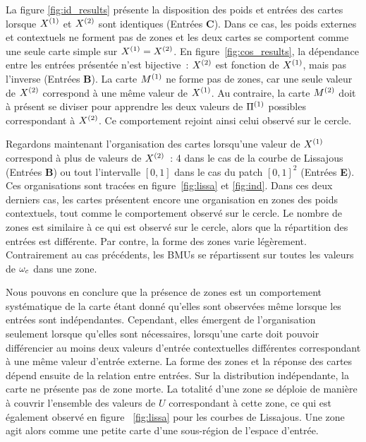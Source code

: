 \documentclass[../main]{subfiles}
\begin{document}
La figure \ref{fig:id_results} présente la disposition des poids et entrées des cartes lorsque $X^{({1})}$ et $X^{({2})}$ sont identiques (Entrées \textbf{C}).
Dans ce cas, les poids externes et contextuels ne forment pas de zones et les deux cartes se comportent comme une seule carte simple sur $X^{({1})} = X^{({2})}$. 
En figure~\ref{fig:cos_results}, la dépendance entre les entrées présentée n'est bijective~: $X^{({2})}$ est fonction de $X^{({1})}$, mais pas l'inverse (Entrées \textbf{B}). 
La carte $M^{({1})}$ ne forme pas de zones, car une seule valeur de $X^{({2})}$ correspond à une même valeur de $X^{({1})}$.
Au contraire, la carte $M^{({2})}$ doit à présent se diviser pour apprendre les deux valeurs de $\Pi^{({1})}$ possibles correspondant à $X^{({2})}$. 
Ce comportement rejoint ainsi celui observé sur le cercle.

Regardons maintenant l'organisation des cartes lorsqu'une valeur de $X^{({1})}$ correspond à plus de valeurs de $X^{({2})}$~: 4 dans le cas de la courbe de Lissajous (Entrées \textbf{B}) ou tout l'intervalle $[0,1]$ dans le cas du patch $[0,1]^2$ (Entrées \textbf{E}). Ces organisations sont tracées en figure~\ref{fig:lissa} et \ref{fig:ind}.
Dans ces deux derniers cas, les cartes présentent encore une organisation en zones des poids contextuels, tout comme le comportement observé sur le cercle. 
Le nombre de zones est similaire à ce qui est observé sur le cercle, alors que la répartition des entrées est différente. Par contre, la forme des zones varie légèrement.
Contrairement au cas précédents, les BMUs se répartissent sur toutes les valeurs de $\omega_c$ dans une zone.


Nous pouvons en conclure que la présence de zones est un comportement systématique de la carte étant donné qu'elles sont observées même lorsque les entrées sont indépendantes. 
Cependant, elles émergent de l'organisation seulement lorsque qu'elles sont nécessaires, lorsqu'une carte doit pouvoir différencier au moins deux valeurs d'entrée contextuelles différentes correspondant à une même valeur d'entrée externe.
La forme des zones et la réponse des cartes dépend ensuite de la relation entre entrées.
Sur la distribution indépendante, la carte ne présente pas de zone morte. La totalité d'une zone se déploie de manière à couvrir l'ensemble des valeurs de $U$ correspondant à cette zone, ce qui est également observé en figure ~\ref{fig:lissa} pour les courbes de Lissajous. Une zone agit alors comme une petite carte d'une sous-région de l'espace d'entrée. 
\end{document}

